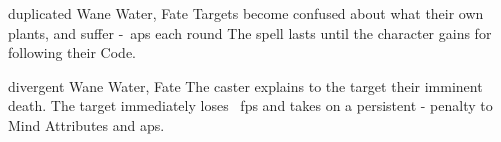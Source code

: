   {duplicated}%
  {Wane}%
  {Water, Fate}%
  {}%
  {Targets become confused about what their own plants, and suffer -~\glspl{ap} each round}%
  {The spell lasts until the character gains  for following their Code.}

  {divergent}%
  {Wane}%
  {Water, Fate}%
  {}%
  {The caster explains to the target their imminent death.
    The target immediately loses \showDam\ \glspl{fp} and takes on a persistent - penalty to Mind Attributes and \glspl{ap}.}%
  {}
